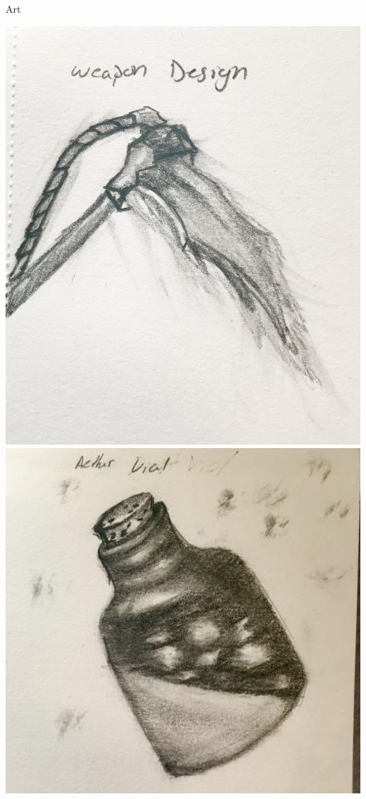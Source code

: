 \documentclass{teamepsilon}
\begin{document}
\begin{frame}{Art}
\begin{minipage}{0.35\textwidth-1em}
        \includegraphics[width=\textwidth]{graphics/scythe}
        \vspace{4mm}
        \includegraphics[width=\textwidth]{graphics/bottle}
    \end{minipage}

\end{frame}
\end{document}
